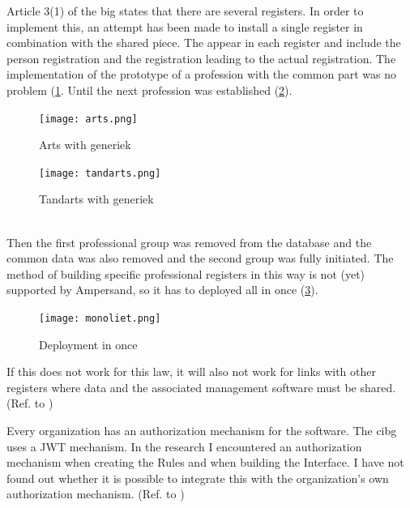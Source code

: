 Article 3(1) of the \acrshort{big} states that there are several registers.
In order to implement this, an attempt has been made to install a single register in combination with the shared piece.
The  appear in each register and include the person registration and the registration leading to the actual registration.
The implementation of the prototype of a profession with the common part was no problem (\ref{fig:arts-deploy}.
Until the next profession was established (\ref{fig:tandarts-deploy}).
 \begin{figure}[h]
     \centering
     \texttt{[image: arts.png]}
     \caption{Arts with generiek}
     \label{fig:arts-deploy}
 \end{figure}
 \hfill
 \begin{figure}[h]
     \centering
     \texttt{[image: tandarts.png]}
    \caption{Tandarts with generiek}
    \label{fig:tandarts-deploy}
 \end{figure}
\\
Then the first professional group was removed from the database and the common data was also removed and the second group was fully initiated.
The method of building specific professional registers in this way is not (yet) supported by Ampersand, so it has to deployed all in once (\ref{fig:monoliet-deployment}).
\begin{figure}[H]
    \centering
        \texttt{[image: monoliet.png]}
        \caption{Deployment in once}
    \label{fig:monoliet-deployment}
\end{figure}
If this does not work for this law, it will also not work for links with other registers where data and the associated management software must be shared.
(Ref. to )



Every organization has an authorization mechanism for the software.
The \acrshort{cibg} uses a JWT mechanism.
In the research I encountered an authorization mechanism when creating the Rules and when building the Interface.
I have not found out whether it is possible to integrate this with the organization's own authorization mechanism.
(Ref. to )


